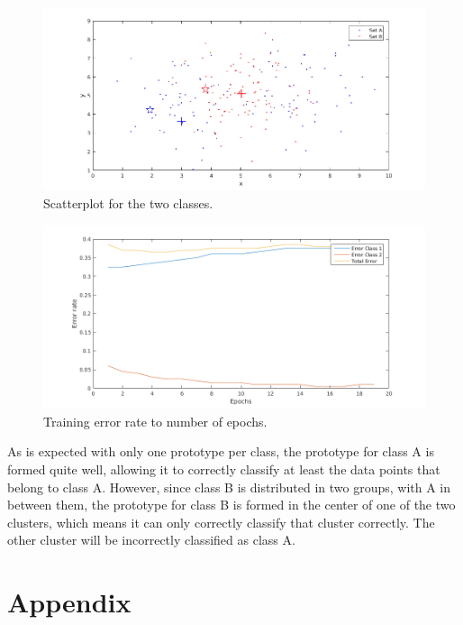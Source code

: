 \documentclass[10pt]{article}
\begin{document}
\begin{figure}[H]
 \centering
 \includegraphics[width=\textwidth]{Fig12_a1.png}
 \caption{Scatterplot for the two classes.}
 \label{fig1.12a1}
\end{figure}
\begin{figure}[H]
 \centering
 \includegraphics[width=\textwidth]{Fig12_a2.png}
 \caption{Training error rate to number of epochs.}
 \label{fig1.12a2}
\end{figure}

As is expected with only one prototype per class, the prototype for class A is formed quite well, allowing it to correctly classify at least the data points that belong to class A. However, since class B is distributed in two groups, with A in between them, the prototype for class B is formed in the center of one of the two clusters, which means it can only correctly classify that cluster correctly. The other cluster will be incorrectly classified as class A.

\subsubsection{}

\section*{Appendix}




\maketitle
\end{document}
